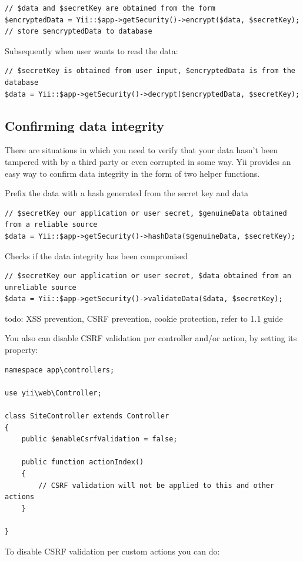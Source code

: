\lstset{language=php}\begin{lstlisting}
// $data and $secretKey are obtained from the form
$encryptedData = Yii::$app->getSecurity()->encrypt($data, $secretKey);
// store $encryptedData to database
\end{lstlisting}
Subsequently when user wants to read the data:

\lstset{language=php}\begin{lstlisting}
// $secretKey is obtained from user input, $encryptedData is from the database
$data = Yii::$app->getSecurity()->decrypt($encryptedData, $secretKey);
\end{lstlisting}
\subsection{Confirming data integrity}
There are situations in which you need to verify that your data hasn't been tampered with by a third party or even corrupted in some way. Yii provides an easy way to confirm data integrity in the form of two helper functions.

Prefix the data with a hash generated from the secret key and data

\lstset{language=php}\begin{lstlisting}
// $secretKey our application or user secret, $genuineData obtained from a reliable source
$data = Yii::$app->getSecurity()->hashData($genuineData, $secretKey);
\end{lstlisting}
Checks if the data integrity has been compromised

\lstset{language=php}\begin{lstlisting}
// $secretKey our application or user secret, $data obtained from an unreliable source
$data = Yii::$app->getSecurity()->validateData($data, $secretKey);
\end{lstlisting}
todo: XSS prevention, CSRF prevention, cookie protection, refer to 1.1 guide

You also can disable CSRF validation per controller and/or action, by setting its property:

\lstset{language=php}\begin{lstlisting}
namespace app\controllers;

use yii\web\Controller;

class SiteController extends Controller
{
    public $enableCsrfValidation = false;

    public function actionIndex()
    {
        // CSRF validation will not be applied to this and other actions
    }

}
\end{lstlisting}
To disable CSRF validation per custom actions you can do:

